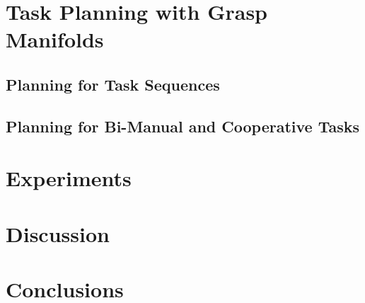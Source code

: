\documentclass{aamas2015}
\begin{document}
%


\section{Task Planning with Grasp Manifolds}

 
\subsection{Planning for Task Sequences}

\subsection{Planning for Bi-Manual and Cooperative Tasks}

\section{Experiments}
 
\section{Discussion}
\section{Conclusions}
\end{document}
